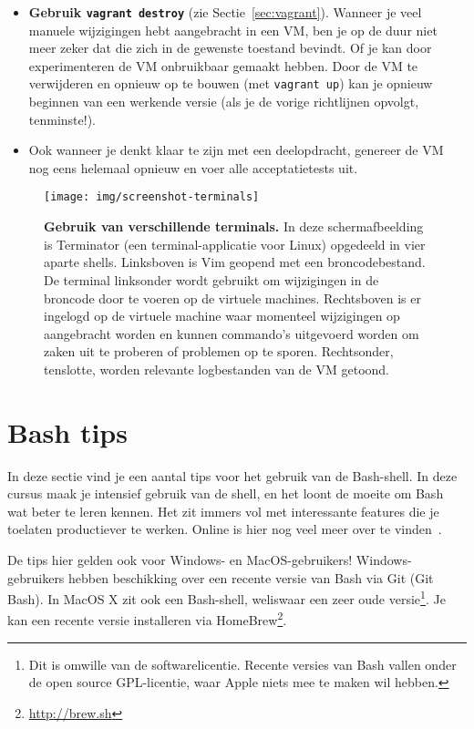 \begin{itemize}
  \item \textbf{Gebruik \texttt{vagrant destroy}} (zie Sectie~\ref{sec:vagrant}). Wanneer je veel manuele wijzigingen hebt aangebracht in een VM, ben je op de duur niet meer zeker dat die zich in de gewenste toestand bevindt. Of je kan door experimenteren de VM onbruikbaar gemaakt hebben. Door de VM te verwijderen en opnieuw op te bouwen (met \texttt{vagrant up}) kan je opnieuw beginnen van een werkende versie (als je de vorige richtlijnen opvolgt, tenminste!).
  \item Ook wanneer je denkt klaar te zijn met een deelopdracht, genereer de VM nog eens helemaal opnieuw en voer alle acceptatietests uit.
\end{itemize}

\begin{figure}
  \centering
  \texttt{[image: img/screenshot-terminals]}
  \caption[Gebruik van verschillende terminals.]{\textbf{Gebruik van verschillende terminals.} In deze schermafbeelding is Terminator (een terminal-applicatie voor Linux) opgedeeld in vier aparte shells. Linksboven is Vim geopend met een broncodebestand. De terminal linksonder wordt gebruikt om wijzigingen in de broncode door te voeren op de virtuele machines. Rechtsboven is er ingelogd op de virtuele machine waar momenteel wijzigingen op aangebracht worden en kunnen commando's uitgevoerd worden om zaken uit te proberen of problemen op te sporen. Rechtsonder, tenslotte, worden relevante logbestanden van de VM getoond.}%
  \label{fig:screenshot-terminals}
\end{figure}

\section{Bash tips}%
\label{sec:bash_tips}

In deze sectie vind je een aantal tips voor het gebruik van de Bash-shell. In deze cursus maak je intensief gebruik van de shell, en het loont de moeite om Bash wat beter te leren kennen. Het zit immers vol met interessante features die je toelaten productiever te werken. Online is hier nog veel meer over te vinden~\autocite{Rowe2009}.

De tips hier gelden ook voor Windows- en MacOS-gebruikers! Windows-gebruikers hebben beschikking over een recente versie van Bash via Git (Git Bash). In MacOS X zit ook een Bash-shell, weliswaar een zeer oude versie\footnote{Dit is omwille van de softwarelicentie. Recente versies van Bash vallen onder de open source GPL-licentie, waar Apple niets mee te maken wil hebben.}. Je kan een recente versie installeren via HomeBrew\footnote{\url{http://brew.sh}}.

